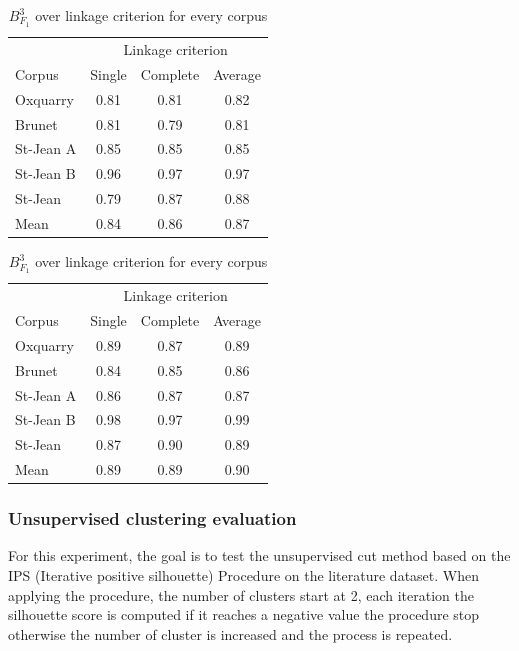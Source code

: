 \begin{table}
  \centering
  \caption{$B^3_{F_1}$ over linkage criterion for every corpus}
  \label{tab:clustering_linkages}

  \label{tab:clustering_linkages_stop_clusters}
  \begin{tabular}{l c c c}
    \toprule
           & \multicolumn{3}{c}{Linkage criterion} \\
    Corpus & Single & Complete & Average \\
    \midrule
    Oxquarry  & 0.81 & 0.81 & 0.82 \\
    Brunet    & 0.81 & 0.79 & 0.81 \\
    St-Jean A & 0.85 & 0.85 & 0.85 \\
    St-Jean B & 0.96 & 0.97 & 0.97 \\
    St-Jean   & 0.79 & 0.87 & 0.88 \\
    \midrule
    Mean      & 0.84 & 0.86 & 0.87 \\
    \bottomrule
  \end{tabular}

  \label{tab:clustering_linkages_stop_distance_threshold}
  \begin{tabular}{l c c c}
    \toprule
           & \multicolumn{3}{c}{Linkage criterion} \\
    Corpus & Single & Complete & Average \\
    \midrule
    Oxquarry  & 0.89 & 0.87 & 0.89 \\
    Brunet    & 0.84 & 0.85 & 0.86 \\
    St-Jean A & 0.86 & 0.87 & 0.87 \\
    St-Jean B & 0.98 & 0.97 & 0.99 \\
    St-Jean   & 0.87 & 0.90 & 0.89 \\
    \midrule
    Mean      & 0.89 & 0.89 & 0.90 \\
    \bottomrule
  \end{tabular}
\end{table}

\subsubsection{Unsupervised clustering evaluation}

For this experiment, the goal is to test the unsupervised cut method based on the IPS (Iterative positive silhouette) Procedure on the literature dataset.
When applying the procedure, the number of clusters start at 2, each iteration the silhouette score is computed if it reaches a negative value the procedure stop otherwise the number of cluster is increased and the process is repeated.

